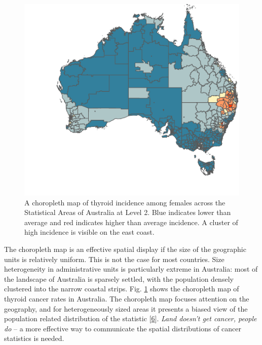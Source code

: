\documentclass[conference,final,]{IEEEtran}
\begin{document}
\begin{figure}

{\centering \includegraphics[width=1\linewidth,height=0.3\textheight]{paper_files/figure-latex/thyroid-choro-1} 

}

\caption{A choropleth map of thyroid incidence among females across the Statistical Areas of Australia at Level 2. Blue indicates lower than average and red indicates higher than average incidence. A cluster of high incidence is visible on the east coast.}\label{fig:thyroid-choro}
\end{figure}

The choropleth map is an effective spatial display if the size of the geographic units is relatively uniform. This is not the case for most countries. Size heterogeneity in administrative units is particularly extreme in Australia: most of the landscape of Australia is sparsely settled, with the population densely clustered into the narrow coastal strips. Fig. \ref{fig:thyroid-choro} shows the choropleth map of thyroid cancer rates in Australia. The choropleth map focuses attention on the geography, and for heterogeneously sized areas it presents a biased view of the population related distribution of the statistic {[}\protect\hyperlink{ref-CBATCC}{6}{]}. \emph{Land doesn't get cancer, people do} -- a more effective way to communicate the spatial distributions of cancer statistics is needed.
\end{document}
